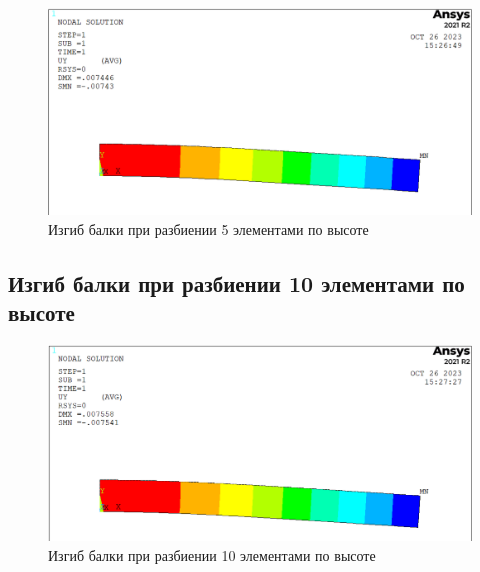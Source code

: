 \documentclass[12pt,a4paper]{article}
\begin{document}
\begin{figure}[h]
	\centering
	\includegraphics[width=1\textwidth]{p4.PNG}
	\caption{Изгиб балки при разбиении 5 элементами по высоте}
\end{figure}

\pagebreak

\subsection{ Изгиб балки при разбиении 10 элементами по высоте }

\begin{figure}[h]
	\centering
	\includegraphics[width=1\textwidth]{p5.PNG}
	\caption{Изгиб балки при разбиении 10 элементами по высоте}
\end{figure}

\pagebreak
    
\end{document}
